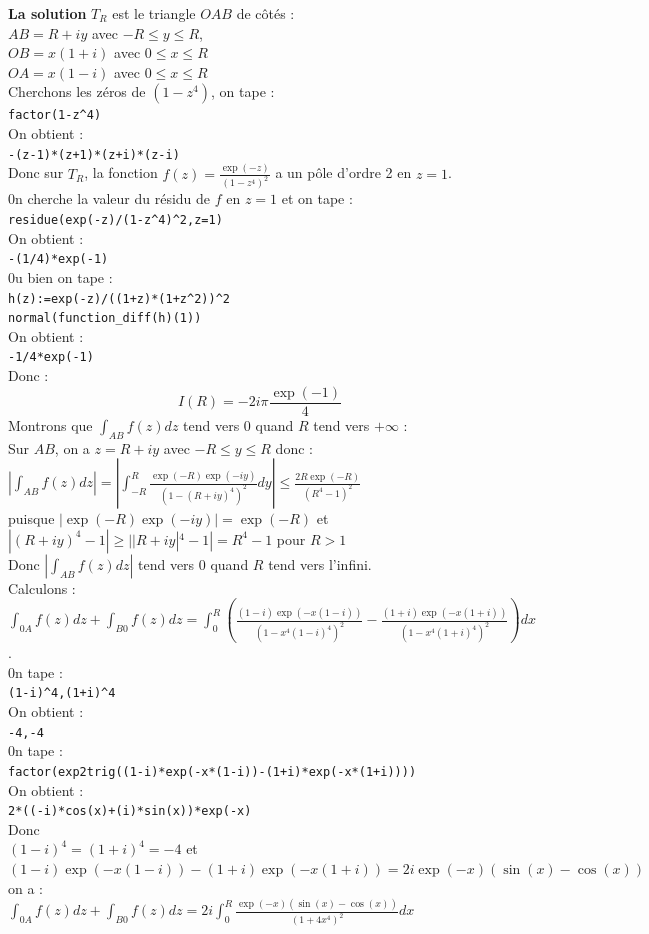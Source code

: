 \documentclass[a4paper,11pt]{book}
\begin{document}
{\bf La solution}
$T_R$ est le triangle $OAB$ de c\^ot\'es :\\
$AB=R+iy$ avec $-R\leq y \leq R$,\\
$OB=x(1+i)$ avec $0 \leq x \leq R$\\
$OA=x(1-i)$ avec $0 \leq x \leq R$\\
Cherchons les z\'eros de $(1-z^4)$, on tape :\\
{\tt factor(1-z\verb|^|4)} \\
On obtient :\\
{\tt -(z-1)*(z+1)*(z+i)*(z-i)}\\
Donc sur $T_R$, la fonction $\displaystyle f(z)=\frac{\exp(-z)}{(1-z^4)^2}$ a un p\^ole 
d'ordre 2 en $z=1$.\\
0n cherche la valeur du r\'esidu de $f$ en $z=1$ et on tape :\\
{\tt residue(exp(-z)/(1-z\verb|^|4)\verb|^|2,z=1)} \\
On obtient :\\
{\tt -(1/4)*exp(-1)}\\
0u bien on tape :\\
{\tt h(z):=exp(-z)/((1+z)*(1+z\verb|^|2))\verb|^|2} \\
{\tt normal(function\_diff(h)(1))} \\
On obtient :\\
{\tt -1/4*exp(-1)}\\
Donc :
$$I(R)=-2i\pi \frac{\exp(-1)}{4}$$
Montrons que $\int_{AB}f(z)dz$ tend vers 0 quand $R$ tend vers $+\infty$ :\\
Sur $AB$, on a $z=R+iy$ avec $-R\leq y \leq R$ donc :\\
$\displaystyle |\int_{AB}f(z)dz|=|\int_{-R}^R\frac{\exp(-R)\exp(-iy)}{(1-(R+iy)^4)^2}dy|\leq \frac{2R\exp(-R)}{(R^4-1)^2}$\\
puisque $|\exp(-R)\exp(-iy)|=\exp(-R)$ et\\
  $|(R+iy)^4-1|\geq ||R+iy|^4-1|=R^4-1$ pour $R>1$\\
Donc $\displaystyle |\int_{AB}f(z)dz|$ tend vers 0 quand $R$ tend vers l'infini.\\
Calculons :\\
$\displaystyle \int_{0A}f(z)dz+\int_{B0}f(z)dz=\int_0^R(\frac{(1-i)\exp(-x(1-i))}{(1-x^4(1-i)^4)^2}-\frac{(1+i)\exp(-x(1+i))}{(1-x^4(1+i)^4)^2})dx$.\\
0n tape :\\
{\tt (1-i)\verb|^|4,(1+i)\verb|^|4} \\
On obtient :\\
{\tt -4,-4}\\
0n tape :\\
{\tt factor(exp2trig((1-i)*exp(-x*(1-i))-(1+i)*exp(-x*(1+i))))} \\
On obtient :\\
{\tt 2*((-i)*cos(x)+(i)*sin(x))*exp(-x)}\\
Donc\\
$(1-i)^4=(1+i)^4=-4$  et \\
$(1-i)\exp(-x(1-i))-(1+i)\exp(-x(1+i))=2i \exp(-x)(\sin(x)-\cos(x))$ \\
on a :\\
$\displaystyle \int_{0A}f(z)dz+\int_{B0}f(z)dz=2i\int_0^R \frac{\exp(-x)(\sin(x)-\cos(x))}{(1+4x^4)^2}dx$
\end{document}
